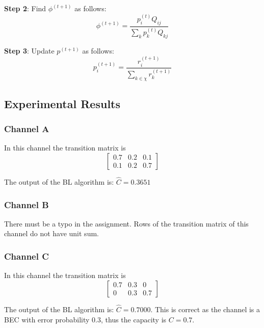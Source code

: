 \documentclass{article}
\begin{document}
	\textbf{Step 2}: Find $\phi^{(t+1)}$ as follows:
	$$\phi^{(t+1)} = \frac{p_i^{(t)} Q_{ij}}{\sum_{k}^{} p_k^{(t)} Q_{kj}}$$
	
	\textbf{Step 3}: Update $p^{(t+1)}$ as follows:
	$$p_i^{(t+1)} = \frac{r_i^{(t+1)}}{\sum_{k \in \chi}^{} r_k^{(t+1)}}$$
	
	\subsection{Experimental Results}
	\subsubsection{Channel A}
	
	In this channel the transition matrix is
	$$\begin{bmatrix}
	0.7&0.2&0.1\\
	0.1&0.2&0.7
	\end{bmatrix}$$
	
	The output of the BL algorithm  is: $\hat{C} =0.3651 $
	\subsubsection{Channel B}
	
	There must be a typo in the assignment. Rows of the transition matrix of this channel do not have unit sum.
	
	\subsubsection{Channel C}
	In this channel the transition matrix is
	$$\begin{bmatrix}
	0.7&0.3&0\\
	0&0.3&0.7
	\end{bmatrix}$$
	
		The output of the BL algorithm is: $\hat{C} =0.7000 $.
		This is correct as the channel is a BEC with error probability $0.3$, thus the capacity is $C = 0.7$.
		
		
\end{document}
